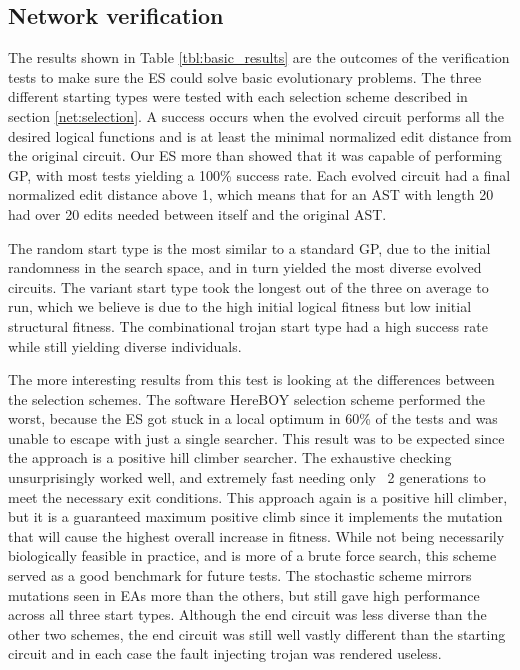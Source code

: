 \documentclass[conference]{IEEEtran}
\begin{document}
{\subsection{Network verification}
\par The results shown in Table \ref{tbl:basic_results} are the outcomes of the verification tests to make sure the ES could solve basic evolutionary problems. 
The three different starting types were tested with each selection scheme described in section \ref{net:selection}.
A success occurs when the evolved circuit performs all the desired logical functions and is at least the minimal normalized edit distance from the original circuit.
Our ES more than showed that it was capable of performing GP, with most tests yielding a 100\% success rate. 
Each evolved circuit had a final normalized edit distance above 1, which means that for an AST with length 20 had over 20 edits needed between itself and the original AST.
\par The random start type is the most similar to a standard GP, due to the initial randomness in the search space, and in turn yielded the most diverse evolved circuits.
The variant start type took the longest out of the three on average to run, which we believe is due to the high initial logical fitness but low initial structural fitness. 
The combinational trojan start type had a high success rate while still yielding diverse individuals.
\par The more interesting results from this test is looking at the differences between the selection schemes.
The software HereBOY selection scheme performed the worst, because the ES got stuck in a local optimum in 60\% of the tests and was unable to escape with just a single searcher.
This result was to be expected since the approach is a positive hill climber searcher.
The exhaustive checking unsurprisingly worked well, and extremely fast needing only ~2 generations to meet the necessary exit conditions. 
This approach again is a positive hill climber, but it is a guaranteed maximum positive climb since it implements the mutation that will cause the highest overall increase in fitness.
While not being necessarily biologically feasible in practice, and is more of a brute force search, this scheme served as a good benchmark for future tests.
The stochastic scheme mirrors mutations seen in EAs more than the others, but still gave high performance across all three start types. 
Although the end circuit was less diverse than the other two schemes, the end circuit was still well vastly different than the starting circuit and in each case the fault injecting trojan was rendered useless.
}
\end{document}
